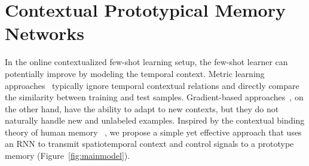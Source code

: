 \section{Contextual Prototypical Memory Networks}

\vspace{-0.1in}
In the online contextualized few-shot learning setup, the few-shot learner can potentially improve
by modeling the temporal context. Metric learning approaches~\citep{protonet} typically ignore
temporal contextual relations and directly compare the similarity between training and test samples.
Gradient-based approaches~\citep{oml}, on the other hand, have the ability to adapt to new contexts,
but they do not naturally handle new and unlabeled examples. Inspired by the
contextual binding theory of human memory ~\citep{ctxbinding}, we propose a simple yet effective
approach that uses an RNN to transmit spatiotemporal context and control signals to a prototype memory
(Figure~\ref{fig:mainmodel}).


